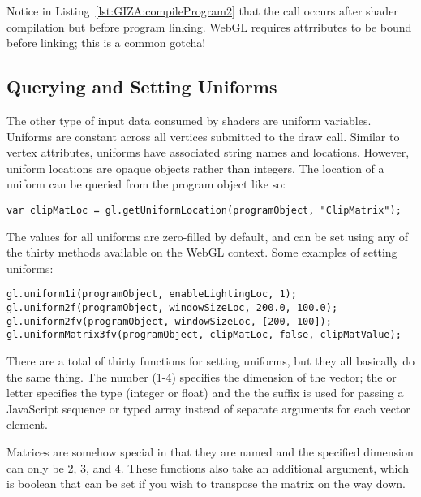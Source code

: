 \begin{sidenote}%
Notice in Listing~\ref{lst:GIZA:compileProgram2} that the  call occurs after shader compilation but before program linking.  WebGL requires attrributes to be bound before linking; this is a common gotcha!
\end{sidenote}%

\subsection{Querying and Setting Uniforms}

The other type of input data consumed by shaders are uniform variables.  Uniforms are constant across all vertices submitted to the draw call.  Similar to vertex attributes, uniforms have associated string names and locations.  However, uniform locations are opaque objects rather than integers.  The location of a uniform can be queried from the program object like so:

\begin{lstlisting}
var clipMatLoc = gl.getUniformLocation(programObject, "ClipMatrix");
\end{lstlisting}

The values for all uniforms are zero-filled by default, and can be set using any of the thirty  methods available on the WebGL context.  Some examples of setting uniforms:

\begin{lstlisting}
gl.uniform1i(programObject, enableLightingLoc, 1);
gl.uniform2f(programObject, windowSizeLoc, 200.0, 100.0);
gl.uniform2fv(programObject, windowSizeLoc, [200, 100]);
gl.uniformMatrix3fv(programObject, clipMatLoc, false, clipMatValue);
\end{lstlisting}

There are a total of thirty functions for setting uniforms, but they all basically do the same thing.  The number (1-4) specifies the dimension of the vector; the  or  letter specifies the type (integer or float) and the the  suffix is used for passing a JavaScript sequence or typed array instead of separate arguments for each vector element.

Matrices are somehow special in that they are named  and the specified dimension can only be 2, 3, and 4.  These functions also take an additional argument, which is boolean that can be set if you wish to transpose the matrix on the way down.

